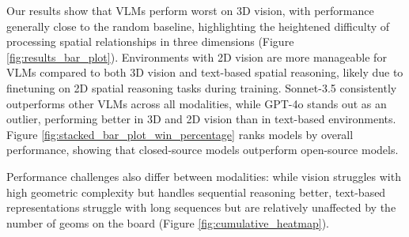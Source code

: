 Our results show that VLMs perform worst on 3D vision, with performance generally close to the random baseline, highlighting the heightened difficulty of processing spatial relationships in three dimensions (Figure \ref{fig:results_bar_plot}). Environments with 2D vision are more manageable for VLMs compared to both 3D vision and text-based spatial reasoning, likely due to finetuning on 2D spatial reasoning tasks during training. Sonnet-3.5 consistently outperforms other VLMs across all modalities, while GPT-4o stands out as an outlier, performing better in 3D and 2D vision than in text-based environments. Figure \ref{fig:stacked_bar_plot_win_percentage} ranks models by overall performance, showing that closed-source models outperform open-source models. 

Performance challenges also differ between modalities: while vision struggles with high geometric complexity but handles sequential reasoning better, text-based representations struggle with long sequences but are relatively unaffected by the number of geoms on the board (Figure \ref{fig:cumulative_heatmap}).